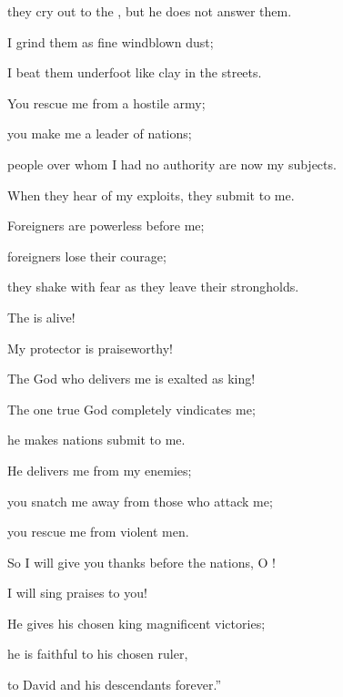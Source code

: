 {\par }{\Q they cry out to the
{}, but he does not
answer them.
\par }{\Q {}I grind
them as fine windblown dust;
\par }{\Q I beat them underfoot
like clay
in the streets.
\par }{\Q {}You rescue
me from a hostile
army;
\par }{\Q you make
me a
leader
of nations;
\par }{\Q people
over whom I had no
authority are now my subjects.
\par }{\Q {}When they hear
of my exploits, they submit
to me.

\par }{\Q Foreigners
are powerless before me;
\par }{\Q {}foreigners
lose their courage;
\par }{\Q they shake with fear as
they leave their
strongholds.
\par }{\Q {}The
{}
is alive!

\par }{\Q My protector
is praiseworthy!

\par }{\Q The God
who delivers
me is exalted as king!
\par }{\Q {}The one true God
completely vindicates
me;

\par }{\Q he makes
nations
submit to me.
\par }{\Q {}He delivers
me from my enemies;
\par }{\Q you snatch
me away from those who attack me;

\par }{\Q you rescue
me from violent
men.
\par }{\Q {}So
I will give you thanks
before the nations,
O
{}!
\par }{\Q I will sing praises
to you!
\par }{\Q {}He gives
his chosen king
magnificent
victories;
\par }{\Q he
is faithful
to his chosen ruler,
\par }{\Q to David
and his descendants
forever.”


}
